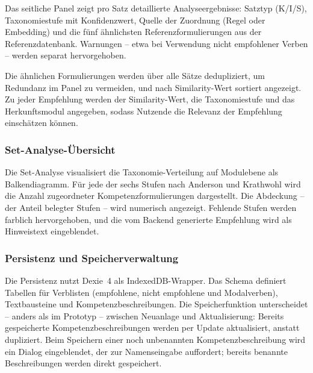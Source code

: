 Das seitliche Panel zeigt pro Satz detaillierte Analyseergebnisse: Satztyp (K/I/S), Taxonomiestufe mit Konfidenzwert, Quelle der Zuordnung (Regel oder Embedding) und die fünf ähnlichsten Referenzformulierungen aus der Referenzdatenbank.
Warnungen -- etwa bei Verwendung nicht empfohlener Verben -- werden separat hervorgehoben.

Die ähnlichen Formulierungen werden über alle Sätze dedupliziert, um Redundanz im Panel zu vermeiden, und nach Similarity-Wert sortiert angezeigt.
Zu jeder Empfehlung werden der Similarity-Wert, die Taxonomiestufe und das Herkunftsmodul angegeben, sodass Nutzende die Relevanz der Empfehlung einschätzen können.

\subsubsection{Set-Analyse-Übersicht}\label{sec:impl-set-analyse}

Die Set-Analyse visualisiert die Taxonomie-Verteilung auf Modulebene als Balkendiagramm.
Für jede der sechs Stufen nach Anderson und Krathwohl wird die Anzahl zugeordneter Kompetenzformulierungen dargestellt.
Die Abdeckung -- der Anteil belegter Stufen -- wird numerisch angezeigt.
Fehlende Stufen werden farblich hervorgehoben, und die vom Backend generierte Empfehlung wird als Hinweistext eingeblendet.

\subsubsection{Persistenz und Speicherverwaltung}\label{sec:impl-persistenz}

Die Persistenz nutzt Dexie~4 als IndexedDB-Wrapper.
Das Schema definiert Tabellen für Verblisten (empfohlene, nicht empfohlene und Modalverben), Textbausteine und Kompetenzbeschreibungen.
Die Speicherfunktion unterscheidet -- anders als im Prototyp -- zwischen Neuanlage und Aktualisierung: Bereits gespeicherte Kompetenzbeschreibungen werden per Update aktualisiert, anstatt dupliziert.
Beim Speichern einer noch unbenannten Kompetenzbeschreibung wird ein Dialog eingeblendet, der zur Namenseingabe auffordert; bereits benannte Beschreibungen werden direkt gespeichert.
